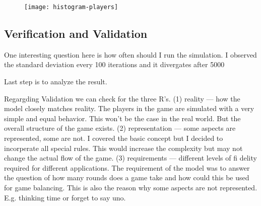\begin{figure}[h!]
  \caption{}
  \texttt{[image: histogram-players]}
\end{figure}

\subsection{Verification and Validation}


One interesting question here is how often should I run the simulation. I observed the standard deviation every 100 iterations and it divergates after 5000

Last step is to analyze the result. 

Regargding Validation we can check for the three R’s.
(1) reality — how the model closely matches reality. The players in the game are simulated with a very simple and equal behavior. This won’t be the case in the real world. But the overall structure of the game exists.
(2) representation — some aspects are represented, some are not. I covered the basic concept but I decided to incorperate all special rules. This would increase the complexity but may not change the actual flow of the game.
(3) requirements — different levels of fi delity required for different applications. The requirement of the model was to answer the question of how many rounds does a game take and how could this be used for game balancing. This is also the reason why some aspects are not represented. E.g. thinking time or forget to say uno.

